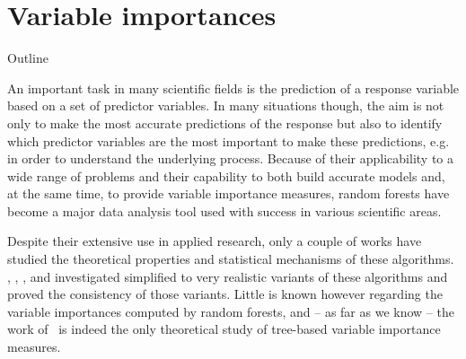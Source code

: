 \chapter{Variable importances}\label{ch:importances}


\begin{remark}{Outline}
\todo{}
\end{remark}


An important task in many scientific fields is the prediction of  a response
variable based on a set of predictor variables. In many situations though, the
aim is not only to make the most accurate predictions of the response but also
to identify which predictor variables are the most important to make these
predictions, e.g. in order to understand the underlying process. Because of
their applicability to a wide range of problems and their capability to both
build accurate models and, at the same time, to provide variable importance
measures, random forests have become a major data analysis tool
used with success in various scientific areas.

Despite their extensive use in applied research, only a couple of works have
studied the theoretical properties and statistical mechanisms of these
algorithms. \citet{zhao:2000}, \citet{breiman:2004},
\citet{biau:2008,biau:2012}, \citet{meinshausen:2006} and \citet{lin:2006}
investigated simplified to very realistic variants of these algorithms and
proved  the consistency of those variants. Little is known however regarding
the variable importances computed by random forests, and -- as far as we know
-- the work of~\citet{ishwaran:2007} is indeed the only theoretical study of
tree-based variable importance measures.


